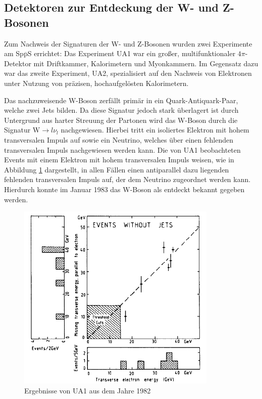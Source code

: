\subsection{Detektoren zur Entdeckung der W- und Z-Bosonen}

Zum Nachweis der Signaturen der W- und Z-Bosonen wurden zwei Experimente am Sp$\overline{\text{p}}$S errichtet:
Das Experiment UA1 war ein großer, multifunktionaler $4\pi$-Detektor mit Driftkammer, Kalorimetern und Myonkammern.
Im Gegensatz dazu war das zweite Experiment, UA2, spezialisiert auf den Nachweis von Elektronen unter Nutzung von präzisen, hochaufgelösten Kalorimetern.

Das nachzuweisende W-Boson zerfällt primär in ein Quark-Antiquark-Paar, welche zwei Jets bilden.
Da diese Signatur jedoch stark überlagert ist durch Untergrund aus harter Streuung der Partonen wird das W-Boson durch die Signatur $\text{W} \rightarrow l \nu_l$ nachgewiesen.
Hierbei tritt ein isoliertes Elektron mit hohem transversalen Impuls auf sowie ein Neutrino, welches über einen fehlenden transversalen Impuls nachgewiesen werden kann.
Die von UA1 beobachteten Events mit einem Elektron mit hohem transversalen Impuls weisen, wie in Abbildung \ref{fig:boson} dargestellt, in allen Fällen einen antiparallel dazu liegenden fehlenden transversalen Impuls auf, der dem Neutrino zugeordnet werden kann.
Hierdurch konnte im Januar 1983 das W-Boson als entdeckt bekannt gegeben werden.

\begin{figure}
  \centering
  \includegraphics[height=9.0cm]{ressources/Screenshot_2018-12-04_18-22-25.png}
  \caption{Ergebnisse von UA1 aus dem Jahre 1982 \cite{boson}}
  \label{fig:boson}
\end{figure}

